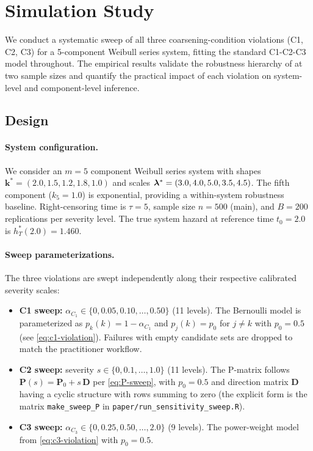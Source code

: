 \section{Simulation Study}
\label{sec:simulations}

We conduct a systematic sweep of all three coarsening-condition violations
(C1, C2, C3) for a 5-component Weibull series system, fitting the standard
C1-C2-C3 model throughout. The empirical results validate the robustness
hierarchy of  at two sample sizes and quantify the
practical impact of each violation on system-level and component-level
inference.

\subsection{Design}
\label{sec:sim-design}

\paragraph{System configuration.}
We consider an $m = 5$ component Weibull series system with shapes
$\mathbf{k}^* = (2.0, 1.5, 1.2, 1.8, 1.0)$ and scales
$\bm{\lambda}^* = (3.0, 4.0, 5.0, 3.5, 4.5)$. The fifth component
($k_5 = 1.0$) is exponential, providing a within-system robustness
baseline. Right-censoring time is $\tau = 5$, sample size $n = 500$
(main), and $B = 200$ replications per severity level. The true system
hazard at reference time $t_0 = 2.0$ is $h_T^*(2.0) = 1.460$.

\paragraph{Sweep parameterizations.}
The three violations are swept independently along their respective
calibrated severity scales:
\begin{itemize}
    \item \textbf{C1 sweep:} $\alpha_{C_1} \in \{0, 0.05, 0.10, \ldots, 0.50\}$
        (11 levels). The Bernoulli model is parameterized as
        $p_k(k) = 1 - \alpha_{C_1}$ and $p_j(k) = p_0$ for $j \neq k$ with
        $p_0 = 0.5$ (see \eqref{eq:c1-violation}). Failures with empty
        candidate sets are dropped to match the practitioner workflow.
    \item \textbf{C2 sweep:} severity $s \in \{0, 0.1, \ldots, 1.0\}$ (11
        levels). The P-matrix follows $\mathbf{P}(s) = \mathbf{P}_0 + s\,\mathbf{D}$
        per \eqref{eq:P-sweep}, with $p_0 = 0.5$ and direction matrix
        $\mathbf{D}$ having a cyclic structure with rows summing to zero
        (the explicit form is the matrix \texttt{make\_sweep\_P} in
        \texttt{paper/run\_sensitivity\_sweep.R}).
    \item \textbf{C3 sweep:} $\alpha_{C_3} \in \{0, 0.25, 0.50, \ldots, 2.0\}$
        (9 levels). The power-weight model from \eqref{eq:c3-violation}
        with $p_0 = 0.5$.
\end{itemize}

